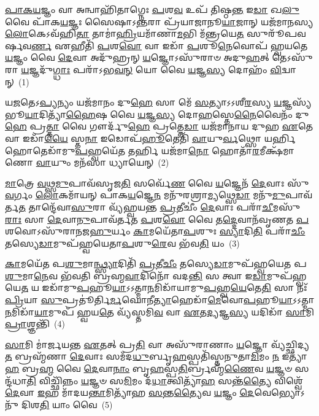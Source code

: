 \setcounter{anuvakam}{0}
\-\ul{𑌪𑌾}\-\-\ul{𑌕}\-\-\ul{𑌯}\-𑌜𑍍𑌞𑌂 𑌵𑌾 𑌅𑌨𑍍𑌵𑌾𑌹𑌿᳴𑌤𑌾𑌗𑍍𑌨𑍇𑌃 \ul{𑌪}\-𑌶\-\ul{𑌵} 𑌉𑌪᳴ 𑌤𑌿𑌷𑍍𑌠\-\ul{𑌨𑍍𑌤} 𑌇\-\ul{𑌡𑌾} 𑌖\-\ul{𑌲𑍁} 𑌵𑍈 𑌪𑌾᳴𑌕\-\ul{𑌯}\-𑌜𑍍𑌞𑌃 𑌸𑍈𑌷𑌾𑌽\-\ul{𑌨𑍍𑌤}\-𑌰𑌾 𑌪𑍍𑌰᳴𑌯𑌾𑌜𑌾𑌨𑍂\-\ul{𑌯𑌾}\-𑌜𑌾𑌨𑍍 𑌯𑌜᳴𑌮𑌾𑌨𑌸𑍍𑌯 \ul{𑌲𑍋}\-𑌕𑍇\-𑌽𑌵᳴𑌹𑌿\-\ul{𑌤𑌾} 𑌤𑌾𑌮𑌾॑\-\ul{𑌹𑍍𑌰𑌿}\-𑌯𑌮𑌾᳴𑌣𑌾\-\ul{𑌮}\-𑌭𑌿 𑌮᳴𑌨𑍍𑌤𑍍𑌰𑌯𑍇\-\ul{𑌤} 𑌸𑍁𑌰𑍂᳴𑌪𑌵𑌰𑍍\mbox{}𑌷𑌵\-\ul{𑌰𑍍𑌣} 𑌏𑌹𑍀𑌤𑌿᳴ \ul{𑌪}\-𑌶\-\ul{𑌵𑍋} 𑌵𑌾 𑌇𑌡𑌾᳴ \ul{𑌪}\-𑌶𑍂\-\ul{𑌨𑍇}\-𑌵𑍋𑌪᳴ 𑌹𑍍𑌵𑌯𑌤𑍇 \ul{𑌯}\-𑌜𑍍𑌞𑌂 𑌵𑍈 \ul{𑌦𑍇}\-𑌵𑌾 𑌅𑌦𑍁᳴𑌹𑍍𑌰𑌨𑍍 \ul{𑌯}\-𑌜𑍍𑌞𑍋\-𑌽𑌸𑍁᳴𑌰𑌾𑍞 𑌅𑌦𑍁\-\ul{𑌹}\-𑌤𑍍 𑌤𑍇\-𑌽𑌸𑍁᳴𑌰𑌾 \ul{𑌯}\-𑌜𑍍𑌞𑌦𑍁᳴\-\ul{𑌗𑍍𑌧𑌾𑌃} 𑌪𑌰𑌾᳴\-𑌽𑌭\-\ul{𑌵}\-\-\ul{𑌨𑍍} 𑌯𑍋 𑌵𑍈 \ul{𑌯}\-𑌜𑍍𑌞\-\ul{𑌸𑍍𑌯} 𑌦𑍋𑌹𑌂᳴ \ul{𑌵𑌿}\-𑌦𑍍𑌵𑌾𑌨𑍍~(1)

𑌯\-\ul{𑌜}\-𑌤𑍇\-𑌽\-\ul{𑌪𑍍𑌯}\-𑌨𑍍𑌯𑌂 𑌯𑌜᳴𑌮𑌾𑌨𑌂 𑌦𑍁\-\ul{𑌹𑍇} 𑌸𑌾 𑌮𑍇᳴ \ul{𑌸}\-𑌤𑍍𑌯𑌾\-𑌽\-𑌽𑌶𑍀\-\ul{𑌰}\-𑌸𑍍𑌯 \ul{𑌯}\-𑌜𑍍𑌞𑌸𑍍𑌯᳴ 𑌭𑍂\-\ul{𑌯𑌾}\-𑌦𑌿𑌤𑍍𑌯𑌾᳴\-\ul{𑌹𑍈}\-𑌷 𑌵𑍈 \ul{𑌯}\-𑌜𑍍𑌞\-\ul{𑌸𑍍𑌯} 𑌦𑍋\-\ul{𑌹}\-𑌸𑍍𑌤𑍇\-\ul{𑌨𑍈}\-𑌵𑍈𑌨𑌂᳴ 𑌦𑍁\-\ul{𑌹𑍇} 𑌪𑍍𑌰\-\ul{𑌤𑍍𑌤𑌾} 𑌵𑍈 𑌗𑍗𑌰𑍍𑌦𑍁᳴\-\ul{𑌹𑍇} 𑌪𑍍𑌰𑌤𑍍𑌤𑍇\-\ul{𑌡𑌾} 𑌯𑌜᳴𑌮𑌾𑌨𑌾𑌯 𑌦𑍁𑌹 \ul{𑌏}\-𑌤𑍇 𑌵𑌾 𑌇𑌡𑌾᳴\-\ul{𑌯𑍈} 𑌸𑍍𑌤\-\ul{𑌨𑌾} 𑌇𑌡𑍋𑌪᳴\-\ul{𑌹𑍂}\-𑌤𑍇𑌤𑌿᳴ \ul{𑌵𑌾}\-𑌯𑍁\-\ul{𑌰𑍍𑌵}\-𑌥𑍍𑌸𑍋 𑌯𑌰𑍍\mbox{}\-\ul{𑌹𑌿} 𑌹𑍋𑌤𑍇𑌡𑌾᳴𑌮𑍁\-\ul{𑌪}\-𑌹𑍍𑌵𑌯𑍇᳴\-\ul{𑌤} 𑌤𑌰𑍍\mbox{}\-\ul{𑌹𑌿} 𑌯𑌜᳴𑌮𑌾\-\ul{𑌨𑍋} 𑌹𑍋𑌤𑌾᳴\-\ul{𑌰}\-𑌮𑍀𑌕𑍍𑌷᳴𑌮𑌾𑌣𑍋 \ul{𑌵𑌾}\-𑌯𑍁𑌂 𑌮𑌨᳴𑌸𑌾 𑌧𑍍𑌯𑌾𑌯𑍇𑌨𑍍~(2)

\-\ul{𑌮𑌾}\-𑌤𑍍𑌰𑍇 \ul{𑌵}\-𑌥𑍍𑌸\-\ul{𑌮𑍁}\-𑌪𑌾𑌵᳴𑌸𑍃𑌜\-\ul{𑌤𑌿} 𑌸𑌰𑍍𑌵𑍇᳴\-\ul{𑌣} 𑌵𑍈 \ul{𑌯}\-𑌜𑍍𑌞𑍇𑌨᳴ \ul{𑌦𑍇}\-𑌵𑌾𑌃 𑌸𑍁᳴\-\ul{𑌵}\-𑌰𑍍𑌗𑌂 \ul{𑌲𑍋}\-𑌕𑌮𑌾᳴𑌯𑌨𑍍 𑌪𑌾𑌕\-\ul{𑌯}\-𑌜𑍍𑌞𑍇\-\ul{𑌨} 𑌮𑌨𑍁᳴𑌰𑌶𑍍𑌰𑌾\-\ul{𑌮𑍍𑌯}\-𑌥𑍍𑌸𑍇\-\ul{𑌡𑌾} 𑌮𑌨𑍁᳴\-\ul{𑌮𑍁}\-𑌪𑌾𑌵᳴𑌰𑍍𑌤\-\ul{𑌤} 𑌤𑌾𑌨𑍍𑌦𑍇᳴𑌵𑌾\-\ul{𑌸𑍁}\-𑌰𑌾 𑌵𑍍𑌯᳴𑌹𑍍𑌵𑌯𑌨𑍍𑌤 \ul{𑌪𑍍𑌰}\-𑌤𑍀𑌚𑍀𑌂॑ \ul{𑌦𑍇}\-𑌵𑌾𑌃 𑌪𑌰𑌾᳴\-\ul{𑌚𑍀}\-𑌮𑌸𑍁᳴\-\ul{𑌰𑌾𑌃} 𑌸𑌾 \ul{𑌦𑍇}\-𑌵𑌾\-\ul{𑌨𑍁}\-𑌪𑌾𑌵᳴𑌰𑍍𑌤𑌤 \ul{𑌪}\-𑌶\-\ul{𑌵𑍋} 𑌵𑍈 𑌤\-\ul{𑌦𑍍𑌦𑍇}\-𑌵𑌾𑌨᳴𑌵𑍃𑌣𑌤 \ul{𑌪}\-𑌶𑌵𑍋\-𑌽𑌸𑍁᳴𑌰𑌾𑌨𑌜\-\ul{𑌹𑍁}\-𑌰𑍍𑌯𑌂 \ul{𑌕𑌾}\-𑌮𑌯𑍇᳴𑌤𑌾\-\ul{𑌪}\-𑌶𑍁𑌃 \ul{𑌸𑍍𑌯𑌾}\-𑌦𑌿\-\ul{𑌤𑌿} 𑌪𑌰𑌾᳴\-\ul{𑌚𑍀𑌂} 𑌤𑌸𑍍𑌯𑍇\-\ul{𑌡𑌾}\-𑌮𑍁𑌪᳴𑌹𑍍𑌵𑌯𑍇𑌤𑌾\-\ul{𑌪}\-𑌶𑍁\-\ul{𑌰𑍇}\-𑌵 𑌭᳴𑌵\-\ul{𑌤𑌿} 𑌯𑌂~(3)

\-\ul{𑌕𑌾}\-𑌮𑌯𑍇᳴𑌤 𑌪\-\ul{𑌶𑍁}\-𑌮𑌾\-\ul{𑌨𑍍𑌥𑍍𑌸𑍍𑌯𑌾}\-𑌦𑌿𑌤𑌿᳴ \ul{𑌪𑍍𑌰}\-𑌤𑍀\-\ul{𑌚𑍀𑌂} 𑌤𑌸𑍍𑌯𑍇\-\ul{𑌡𑌾}\-𑌮𑍁𑌪᳴𑌹𑍍𑌵𑌯𑍇𑌤 𑌪\-\ul{𑌶𑍁}\-𑌮𑌾\-\ul{𑌨𑍇}\-𑌵 𑌭᳴𑌵𑌤𑌿 𑌬𑍍𑌰𑌹𑍍𑌮\-\ul{𑌵𑌾}\-𑌦𑌿𑌨𑍋᳴ 𑌵𑌦\-\ul{𑌨𑍍𑌤𑌿} 𑌸 𑌤𑍍𑌵𑌾 𑌇\-\ul{𑌡𑌾}\-𑌮𑍁𑌪᳴𑌹𑍍𑌵𑌯𑍇\-\ul{𑌤} 𑌯 𑌇𑌡𑌾᳴𑌮𑍁\-\ul{𑌪}\-𑌹𑍂\-\ul{𑌯𑌾}\-\-𑌽\-𑌽𑌤𑍍𑌮𑌾\-\ul{𑌨}\-𑌮𑌿𑌡𑌾᳴𑌯𑌾𑌮𑍁\-\ul{𑌪}\-𑌹𑍍𑌵\-\ul{𑌯𑍇}\-𑌤𑍇\-\ul{𑌤𑌿} 𑌸𑌾 𑌨𑌃᳴ \ul{𑌪𑍍𑌰𑌿}\-𑌯𑌾 \ul{𑌸𑍁}\-𑌪𑍍𑌰𑌤𑍂॑𑌰𑍍𑌤𑌿\-\ul{𑌰𑍍𑌮}\-𑌘𑍋𑌨𑍀\-\ul{𑌤𑍍𑌯𑌾}\-𑌹𑍇𑌡𑌾᳴\-\ul{𑌮𑍇}\-𑌵𑍋\-\ul{𑌪}\-𑌹𑍂\-\ul{𑌯𑌾}\-\-𑌽\-𑌽𑌤𑍍𑌮𑌾\-\ul{𑌨}\-𑌮𑌿𑌡𑌾᳴\-\ul{𑌯𑌾}\-𑌮𑍁𑌪᳴ 𑌹𑍍𑌵𑌯\-\ul{𑌤𑍇} 𑌵𑍍𑌯᳴𑌸𑍍𑌤𑌮𑌿\-\ul{𑌵} 𑌵𑌾 \ul{𑌏}\-𑌤\-\ul{𑌦𑍍𑌯}\-𑌜𑍍𑌞\-\ul{𑌸𑍍𑌯} 𑌯𑌦𑌿𑌡𑌾᳴ \ul{𑌸𑌾}\-𑌮𑌿 \ul{𑌪𑍍𑌰𑌾}\-𑌶𑍍𑌞𑌨𑍍𑌤𑌿᳴~(4)

\-\ul{𑌸𑌾}\-𑌮𑌿 𑌮𑌾॑𑌰𑍍𑌜𑌯𑌨𑍍𑌤 \ul{𑌏}\-𑌤𑌤𑍍 𑌪𑍍𑌰\-\ul{𑌤𑌿} 𑌵𑌾 𑌅𑌸𑍁᳴𑌰𑌾𑌣𑌾𑌂 \ul{𑌯}\-𑌜𑍍𑌞𑍋 𑌵𑍍𑌯᳴𑌚𑍍𑌛𑌿𑌦𑍍𑌯\-\ul{𑌤} 𑌬𑍍𑌰𑌹𑍍𑌮᳴𑌣𑌾 \ul{𑌦𑍇}\-𑌵𑌾𑌃 𑌸𑌮᳴𑌦\-\ul{𑌧𑍁}\-𑌰𑍍𑌬𑍃\-\ul{𑌹}\-𑌸𑍍𑌪𑌤𑌿᳴𑌸𑍍𑌤𑌨𑍁𑌤𑌾\-\ul{𑌮𑌿}\-𑌮𑌂 \ul{𑌨} 𑌇𑌤𑍍𑌯𑌾᳴\-\ul{𑌹} 𑌬𑍍𑌰\-\ul{𑌹𑍍𑌮} 𑌵𑍈 \ul{𑌦𑍇}\-𑌵𑌾\-\ul{𑌨𑌾𑌂} 𑌬𑍃\-\ul{𑌹}\-𑌸𑍍𑌪\-\ul{𑌤𑌿}\-𑌰𑍍𑌬𑍍𑌰𑌹𑍍𑌮᳴\-\ul{𑌣𑍈}\-𑌵 \ul{𑌯}\-𑌜𑍍𑌞𑍞 𑌸𑌨𑍍𑌦᳴𑌧𑌾\-\ul{𑌤𑌿} 𑌵𑌿𑌚𑍍𑌛𑌿᳴𑌨𑍍𑌨𑌂 \ul{𑌯}\-𑌜𑍍𑌞𑍞 𑌸\-\ul{𑌮𑌿}\-𑌮𑌂 𑌦᳴\-\ul{𑌧𑌾}\-𑌤𑍍𑌵𑌿𑌤𑍍𑌯𑌾᳴\-\ul{𑌹} 𑌸𑌨𑍍𑌤᳴\-\ul{𑌤𑍍𑌯𑍈} 𑌵𑌿𑌶𑍍𑌵𑍇᳴ \ul{𑌦𑍇}\-𑌵𑌾 \ul{𑌇}\-𑌹 𑌮𑌾᳴𑌦𑌯\-\ul{𑌨𑍍𑌤𑌾}\-𑌮𑌿𑌤𑍍𑌯𑌾᳴𑌹 \ul{𑌸}\-𑌨𑍍𑌤\-\ul{𑌤𑍍𑌯𑍈}\-𑌵 \ul{𑌯}\-𑌜𑍍𑌞𑌂 \ul{𑌦𑍇}\-𑌵𑍇𑌭𑍍𑌯𑍋\-𑌽𑌨𑍁᳴ 𑌦𑌿𑌶\-\ul{𑌤𑌿} 𑌯𑌾𑌂 𑌵𑍈~(5)


